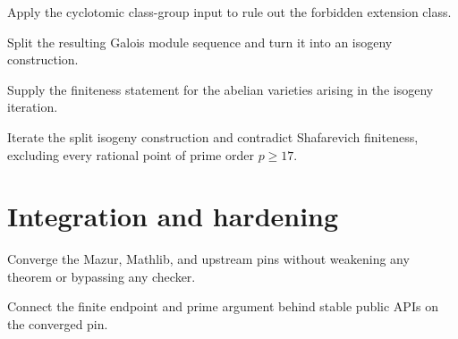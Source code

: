 \begin{theorem}\label{node:MT-PRIME-HERBRAND-KUMMER}
Apply the cyclotomic class-group input to rule out the forbidden extension
class.
\leanpending
\end{theorem}

\begin{theorem}\label{node:MT-PRIME-SPLIT-SEQUENCE}
Split the resulting Galois module sequence and turn it into an isogeny
construction.
\leanpending
\end{theorem}

\begin{theorem}\label{node:MT-PRIME-SHAFAREVICH}
Supply the finiteness statement for the abelian varieties arising in the
isogeny iteration.
\leanpending
\end{theorem}

\begin{theorem}\label{node:MT-PRIME-ISOGENY-CHAIN}
Iterate the split isogeny construction and contradict Shafarevich finiteness,
excluding every rational point of prime order \(p\geq 17\).
\leanpending
\end{theorem}

\chapter{Integration and hardening}

\begin{milestone}\label{node:MT-PIN-MIGRATION}
Converge the Mazur, Mathlib, and upstream pins without weakening any theorem
or bypassing any checker.
\leanpending
\end{milestone}

\begin{milestone}\label{node:MT-API-INTEGRATION}
Connect the finite endpoint and prime argument behind stable public APIs on
the converged pin.
\leanpending
\end{milestone}


